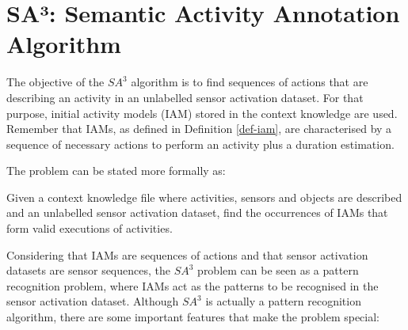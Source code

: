 \section{SA³: Semantic Activity Annotation Algorithm}
\label{sec:clustering:sa3}

The objective of the $SA^3$ algorithm is to find sequences of actions that are describing an activity in an unlabelled sensor activation dataset. For that purpose, initial activity models (IAM) stored in the context knowledge are used. Remember that IAMs, as defined in Definition \ref{def-iam}, are characterised by a sequence of necessary actions to perform an activity plus a duration estimation. 

The problem can be stated more formally as:

\begin{problem}[$SA^3$]
\label{prob-sa3}
 Given a context knowledge file where activities, sensors and objects are described and an unlabelled sensor activation dataset, find the occurrences of IAMs that form valid executions of activities.
\end{problem}

Considering that IAMs are sequences of actions and that sensor activation datasets are sensor sequences, the $SA^3$ problem can be seen as a pattern recognition problem, where IAMs act as the patterns to be recognised in the sensor activation dataset. Although $SA^3$ is actually a pattern recognition algorithm, there are some important features that make the problem special:

